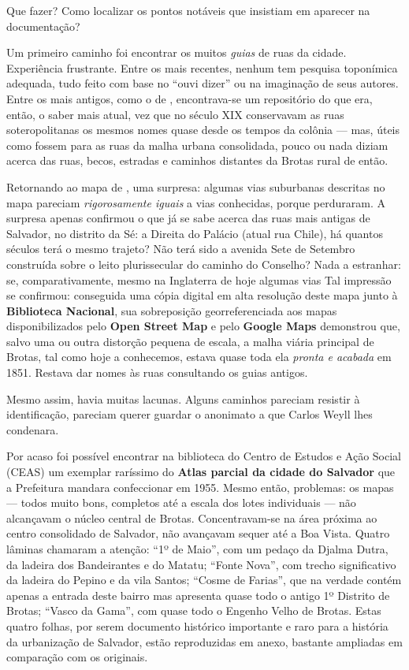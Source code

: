 Que fazer? Como localizar os pontos notáveis que insistiam em aparecer na documentação?

Um primeiro caminho foi encontrar os muitos \textit{guias} de ruas da cidade. Experiência frustrante. Entre os mais recentes, nenhum tem pesquisa toponímica adequada, tudo feito com base no ``ouvi dizer'' ou na imaginação de seus autores. Entre os mais antigos, como o de , encontrava-se um repositório do que era, então, o saber mais atual, vez que no século XIX conservavam as ruas soteropolitanas os mesmos nomes quase desde os tempos da colônia --- mas, úteis como fossem para as ruas da malha urbana consolidada, pouco ou nada diziam acerca das ruas, becos, estradas e caminhos distantes da Brotas rural de então.

Retornando ao mapa de , uma surpresa: algumas vias suburbanas descritas no mapa pareciam \textit{rigorosamente iguais} a vias conhecidas, porque perduraram. A surpresa apenas confirmou o que já se sabe acerca das ruas mais antigas de Salvador, no distrito da Sé: a Direita do Palácio (atual rua Chile), há quantos séculos terá o mesmo trajeto? Não terá sido a avenida Sete de Setembro construída sobre o leito plurissecular do caminho do Conselho? Nada a estranhar: se, comparativamente, mesmo na Inglaterra de hoje algumas vias  Tal impressão se confirmou: conseguida uma cópia digital em alta resolução deste mapa junto à \textbf{Biblioteca Nacional}, sua sobreposição georreferenciada aos mapas disponibilizados pelo \textbf{Open Street Map} e pelo \textbf{Google Maps} demonstrou que, salvo uma ou outra distorção pequena de escala, a malha viária principal de Brotas, tal como hoje a conhecemos, estava quase toda ela \textit{pronta e acabada} em 1851. Restava dar nomes às ruas consultando os guias antigos.

Mesmo assim, havia muitas lacunas. Alguns caminhos pareciam resistir à identificação, pareciam querer guardar o anonimato a que Carlos Weyll lhes condenara.

Por acaso foi possível encontrar na biblioteca do Centro de Estudos e Ação Social (CEAS) um exemplar raríssimo do \textbf{Atlas parcial da cidade do Salvador} que a Prefeitura mandara confeccionar em 1955. Mesmo então, problemas: os mapas --- todos muito bons, completos até a escala dos lotes individuais --- não alcançavam o núcleo central de Brotas. Concentravam-se na área próxima ao centro consolidado de Salvador, não avançavam sequer até a Boa Vista. Quatro lâminas chamaram a atenção: ``1º de Maio'', com um pedaço da Djalma Dutra, da ladeira dos Bandeirantes e do Matatu; ``Fonte Nova'', com trecho significativo da ladeira do Pepino e da vila Santos; ``Cosme de Farias'', que na verdade contém apenas a entrada deste bairro mas apresenta quase todo o antigo 1º Distrito de Brotas; ``Vasco da Gama'', com quase todo o Engenho Velho de Brotas. Estas quatro folhas, por serem documento histórico importante e raro para a história da urbanização de Salvador, estão reproduzidas em anexo, bastante ampliadas em comparação com os originais.

